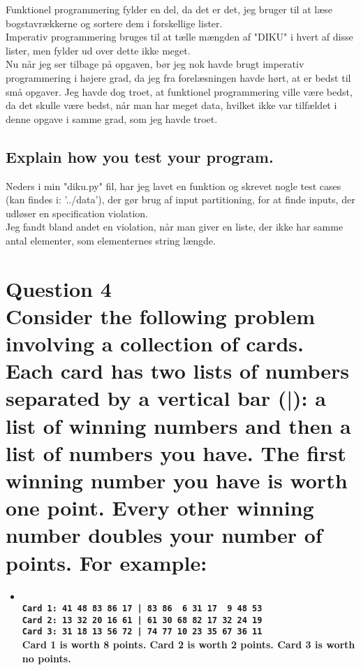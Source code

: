 \documentclass[a4paper,12pt]{article}
\begin{document}
Funktionel programmering fylder en del, da det er det, jeg bruger til at læse bogstavrækkerne og sortere dem i forskellige lister.\\
Imperativ programmering bruges til at tælle mængden af "DIKU" i hvert af disse lister, men fylder ud over dette ikke meget.\\
Nu når jeg ser tilbage på opgaven, bør jeg nok havde brugt imperativ programmering i højere grad, da jeg fra forelæsningen havde hørt, at er bedst til små opgaver. Jeg havde dog troet, at funktionel programmering ville være bedst, da det skulle være bedst, når man har meget data, hvilket ikke var tilfældet i denne opgave i samme grad, som jeg havde troet.

\subsection[Explain how you test your program]{Explain how you test your program.}

Neders i min "diku.py" fil, har jeg lavet en funktion og skrevet nogle test cases (kan findes i: '../data'), der gør brug af input partitioning, for at finde inputs, der udløser en specification violation.\\
Jeg fandt bland andet en violation, når man giver en liste, der ikke har samme antal elementer, som elementernes string længde.

\section[Question 4 - Cards]{Question 4\\
Consider the following problem involving a collection of cards.
Each card has two lists of numbers separated by a vertical bar (|): a list of winning numbers and then a list of numbers you have.
The first winning number you have is worth one point. Every other winning number doubles your number of points.
For example:}
\begin{itemize}
    \item[] \textbf{\\
    \lstinline{Card 1: 41 48 83 86 17 | 83 86  6 31 17  9 48 53}\\
    \lstinline{Card 2: 13 32 20 16 61 | 61 30 68 82 17 32 24 19}\\
    \lstinline{Card 3: 31 18 13 56 72 | 74 77 10 23 35 67 36 11}\\
    Card 1 is worth 8 points. Card 2 is worth 2 points. Card 3 is worth no points.}
\end{itemize}
\end{document}
